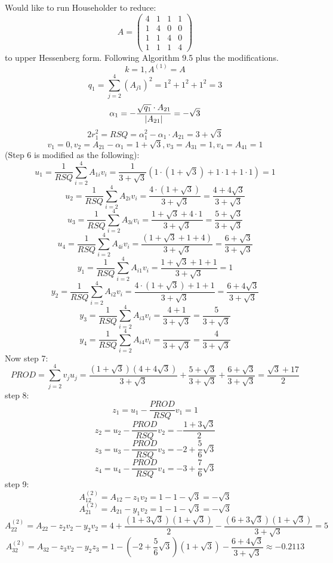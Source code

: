 \documentclass[12pt]{article} %
\newcommand{\1}[1]{\mathds{1}\left[#1\right]}
\begin{document}
\subsubsection{}
Would like to run Householder to reduce:
$$
A = 
\begin{pmatrix}
		4 & 1 & 1 & 1 \\
		1 & 4 & 0 & 0 \\
		1 & 1 & 4 & 0 \\
		1 & 1 & 1 & 4
	\end{pmatrix}
$$ to upper Hessenberg form. Following Algorithm 9.5 plus the modifications.
$$
	k = 1, A^{(1)} = A
$$ 
$$
	q_1 = \sum_{j=2}^4 (A_{j1})^2 = 1^2 + 1^2 + 1^2 = 3
$$
$$
	\alpha_1 = -\frac{\sqrt{q_1}\cdot A_{21}}{\abs{A_{21}}} = -\sqrt{3}
$$
$$
	2r_1^2 = RSQ = \alpha_1^2 - \alpha_1\cdot A_{21} = 3+\sqrt{3}
$$
$$
	v_1 = 0, v_2 = A_{21}-\alpha_1 = 1+\sqrt{3}, v_3 = A_{31} = 1, v_4 = A_{41} = 1
$$ (Step 6 is modified as the following):
$$
	u_1 = \frac{1}{RSQ}\sum_{i=2}^4A_{1i}v_i = \frac{1}{3+\sqrt{3}}(1\cdot (1+\sqrt{3}) + 1\cdot 1 + 1\cdot 1) = 1
$$
$$
	u_2 = \frac{1}{RSQ}\sum_{i=2}^4A_{2i}v_i = \frac{4\cdot (1+\sqrt{3})}{3+\sqrt{3}} = \frac{4+4\sqrt{3}}{3+\sqrt{3}}
$$
$$
u_3 = \frac{1}{RSQ}\sum_{i=2}^4A_{3i}v_i = \frac{1+\sqrt{3} + 4\cdot 1}{3+\sqrt{3}} = \frac{5+\sqrt{3}}{3+\sqrt{3}}
$$
$$
u_4 = \frac{1}{RSQ}\sum_{i=2}^4A_{4i}v_i = \frac{(1+\sqrt{3} + 1 + 4)}{3+\sqrt{3}} = \frac{6+\sqrt{3}}{3+\sqrt{3}}
$$
$$
	y_1 = \frac{1}{RSQ}\sum_{i=2}^4 A_{i1}v_i = \frac{1+\sqrt{3}+1+1}{3+\sqrt{3}} = 1
$$
$$
	y_2 = \frac{1}{RSQ}\sum_{i=2}^4 A_{i2}v_i =\frac{4\cdot (1+\sqrt{3}) + 1+1}{3+\sqrt{3}} = \frac{6+4\sqrt{3}}{3+\sqrt{3}}
$$
$$
y_3 = \frac{1}{RSQ}\sum_{i=2}^4 A_{i3}v_i = \frac{4+1}{3+\sqrt{3}} = \frac{5}{3+\sqrt{3}}
$$
$$
y_4 = \frac{1}{RSQ}\sum_{i=2}^4 A_{i4}v_i = \frac{}{3+\sqrt{3}} = \frac{4}{3+\sqrt{3}}
$$ Now step 7:
$$
	PROD = \sum_{j=2}^4 v_ju_j = \frac{(1+\sqrt{3})(4+4\sqrt{3})}{3+\sqrt{3}} + \frac{5+\sqrt{3}}{3+\sqrt{3}} + \frac{6+\sqrt{3}}{3+\sqrt{3}} = \frac{\sqrt{3}+17}{2}
$$ step 8:
$$
	z_1 = u_1 - \frac{PROD}{RSQ}v_1 = 1
$$
$$
	z_2 = u_2 - \frac{PROD}{RSQ}v_2 = -\frac{1+3\sqrt{3}}{2}
$$
$$
	z_3 = u_3 - \frac{PROD}{RSQ}v_3 = -2+\frac{5}{6}\sqrt{3}
$$
$$
z_4 = u_4 - \frac{PROD}{RSQ}v_4 = -3+\frac{7}{6}\sqrt{3}
$$ step 9:
$$
	A^{(2)}_{12} =A_{12} - z_1v_2 = 1-1-\sqrt{3} = -\sqrt{3}
$$
$$
	A_{21}^{(2)} = A_{21}-y_1v_2=1-1-\sqrt{3} = -\sqrt{3}
$$
$$
A_{22}^{(2)} = A_{22}-z_2v_2-y_2v_2 = 4+\frac{(1+3\sqrt{3})(1+\sqrt{3})}{2} - \frac{(6+3\sqrt{3})(1+\sqrt{3})}{3+\sqrt{3}}=5
$$	
$$
	A_{32}^{(2)} = A_{32} - z_3v_2 - y_2z_3 = 1-(-2+\frac{5}{6}\sqrt{3})(1+\sqrt{3}) - \frac{6+4\sqrt{3}}{3+\sqrt{3}} \approx -0.2113
$$
\end{document}
